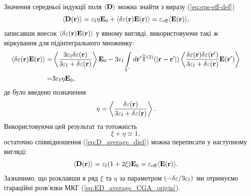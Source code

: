 \documentclass[14pt,twoside]{vakthesis}
\begin{document}
Значення середньої індукції поля $\langle \bf D \rangle$ можна знайти з виразу (\ref{eq:eps-eff-def})
\begin{equation}\label{eq:D_average_diel}
\langle {\bf D} ({\bf r}) \rangle = \varepsilon_{\rm f} \eta {\bf E}_0 + \langle \delta\varepsilon ({\bf r}) {\bf E}({\bf r}) \rangle
= \varepsilon_{\rm eff} \langle {\bf E}({\bf r}) \rangle,
\end{equation}
записавши внесок $\langle \delta\varepsilon ({\bf r}) {\bf E}({\bf r}) \rangle$ у явному вигляді, використовуючи такі ж міркування для підінтегрального множнику:
\begin{equation}
\begin{split}
\langle \delta\varepsilon ({\bf r}) {\bf E}({\bf r}) \rangle
=&  \left\langle { \frac{3 \varepsilon_{\rm f} \delta\varepsilon({\bf r})}{3 \varepsilon_{\rm f} + \delta\varepsilon({\bf r})} } \right\rangle {\bf E}_0 - 3 \varepsilon_{\rm f} \int\limits_V {d{\mathbf{r}}'} { \rm{\widetilde T}}^{(2)} (| {\bf r} - {\bf r}' |)     \left\langle \frac{\delta \varepsilon ({\mathbf{r}}) \delta \varepsilon ({\mathbf{r}}')}{3 \varepsilon_{\rm f} + \delta \varepsilon({\bf r})}{\mathbf{E}}({\mathbf{r}}') \right\rangle \\
=& 3 \varepsilon_{\rm f} \eta {\bf E}_0, 
\end{split}
\end{equation}
де було введено позначення
$$
\eta = \left\langle { \frac{ \delta\varepsilon({\bf r})}{3 \varepsilon_{\rm f} + \delta\varepsilon({\bf r})} } \right\rangle.
$$
Використовуючи цей результат та тотожність
\begin{equation}\label{eq:xi-eta_rel}
\xi + \eta \equiv 1,
\end{equation}
остаточно співвідношення (\ref{eq:D_average_diel}) можна переписати у наступному вигляді:
\begin{equation}\label{eq:D_average_diel2}
\langle {\bf D} ({\bf r}) \rangle
= \varepsilon_{\rm f} (1 + 2\xi) {\bf E}_0
= \varepsilon_{\rm eff} \langle {\bf E}({\bf r}) \rangle.
\end{equation}
Зазначимо, що розклавши в ряд $\xi$ та $\eta$
за параметром $(- \delta\varepsilon/3\varepsilon_{\rm f})$
ми отримуємо ітараційні розв'язки МКГ (\ref{eq:ED_average_CGA_origin}).
\end{document}
